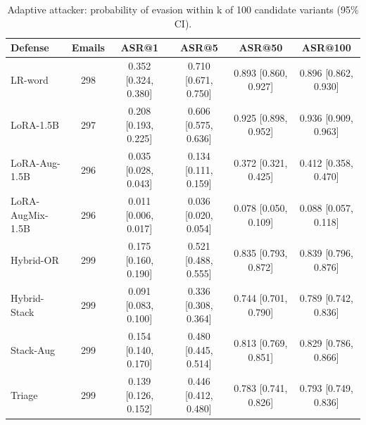\begin{table}[t]
\centering
\caption{Adaptive attacker: probability of evasion within k of 100 candidate variants (95\% CI).}
\label{tab:adaptive}
\footnotesize
\begin{tabular}{lccccc}
\toprule
\textbf{Defense} & \textbf{Emails} & \textbf{ASR@1} & \textbf{ASR@5} & \textbf{ASR@50} & \textbf{ASR@100} \\
\midrule
LR-word & 298 & 0.352 [0.324, 0.380] & 0.710 [0.671, 0.750] & 0.893 [0.860, 0.927] & 0.896 [0.862, 0.930] \\
LoRA-1.5B & 297 & 0.208 [0.193, 0.225] & 0.606 [0.575, 0.636] & 0.925 [0.898, 0.952] & 0.936 [0.909, 0.963] \\
LoRA-Aug-1.5B & 296 & 0.035 [0.028, 0.043] & 0.134 [0.111, 0.159] & 0.372 [0.321, 0.425] & 0.412 [0.358, 0.470] \\
LoRA-AugMix-1.5B & 296 & 0.011 [0.006, 0.017] & 0.036 [0.020, 0.054] & 0.078 [0.050, 0.109] & 0.088 [0.057, 0.118] \\
Hybrid-OR & 299 & 0.175 [0.160, 0.190] & 0.521 [0.488, 0.555] & 0.835 [0.793, 0.872] & 0.839 [0.796, 0.876] \\
Hybrid-Stack & 299 & 0.091 [0.083, 0.100] & 0.336 [0.308, 0.364] & 0.744 [0.701, 0.790] & 0.789 [0.742, 0.836] \\
Stack-Aug & 299 & 0.154 [0.140, 0.170] & 0.480 [0.445, 0.514] & 0.813 [0.769, 0.851] & 0.829 [0.786, 0.866] \\
Triage & 299 & 0.139 [0.126, 0.152] & 0.446 [0.412, 0.480] & 0.783 [0.741, 0.826] & 0.793 [0.749, 0.836] \\
\bottomrule
\end{tabular}
\end{table}